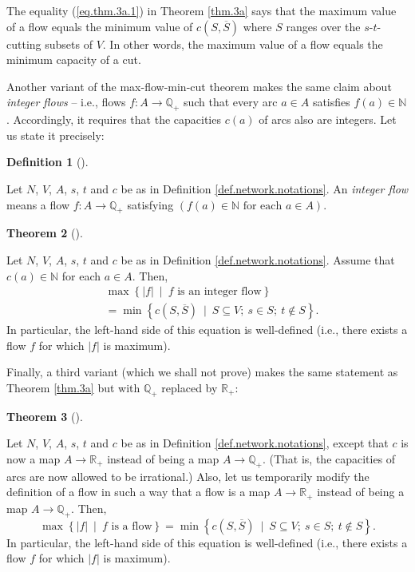 \documentclass[numbers=enddot,12pt,final,onecolumn,notitlepage]{scrartcl}%
\theoremstyle{definition}
\newtheorem{theo}{Theorem}[section]
\newenvironment{theorem}[1][]
{\begin{theo}[#1]\begin{leftbar}}
{\end{leftbar}\end{theo}}
\newtheorem{defi}[theo]{Definition}
\newenvironment{definition}[1][]
{\begin{defi}[#1]\begin{leftbar}}
{\end{leftbar}\end{defi}}
\begin{document}
The equality (\ref{eq.thm.3a.1}) in Theorem \ref{thm.3a} says that the maximum
value of a flow equals the minimum value of $c\left(  S,\overline{S}\right)  $
where $S$ ranges over the $s$-$t$-cutting subsets of $V$. In other words, the
maximum value of a flow equals the minimum capacity of a cut.

Another variant of the max-flow-min-cut theorem makes the same claim about
\textit{integer flows} -- i.e., flows $f:A\rightarrow\mathbb{Q}_{+}$ such that
every arc $a\in A$ satisfies $f\left(  a\right)  \in\mathbb{N}$. Accordingly,
it requires that the capacities $c\left(  a\right)  $ of arcs also are
integers. Let us state it precisely:

\begin{definition}
Let $N$, $V$, $A$, $s$, $t$ and $c$ be as in Definition
\ref{def.network.notations}. An \textit{integer flow} means a flow
$f:A\rightarrow\mathbb{Q}_{+}$ satisfying $\left(  f\left(  a\right)
\in\mathbb{N}\text{ for each }a\in A\right)  $.
\end{definition}

\begin{theorem}
\label{thm.3b}Let $N$, $V$, $A$, $s$, $t$ and $c$ be as in Definition
\ref{def.network.notations}. Assume that $c\left(  a\right)  \in\mathbb{N}$
for each $a\in A$. Then,%
\begin{align*}
&  \max\left\{  \left\vert f\right\vert \ \mid\ f\text{ is an integer
flow}\right\} \\
&  =\min\left\{  c\left(  S,\overline{S}\right)  \ \mid\ S\subseteq V;\ s\in
S;\ t\notin S\right\}  .
\end{align*}
In particular, the left-hand side of this equation is well-defined (i.e.,
there exists a flow $f$ for which $\left\vert f\right\vert $ is maximum).
\end{theorem}

Finally, a third variant (which we shall not prove) makes the same statement
as Theorem \ref{thm.3a} but with $\mathbb{Q}_{+}$ replaced by $\mathbb{R}_{+}$:

\begin{theorem}
\label{thm.3c}Let $N$, $V$, $A$, $s$, $t$ and $c$ be as in Definition
\ref{def.network.notations}, except that $c$ is now a map $A\rightarrow
\mathbb{R}_{+}$ instead of being a map $A\rightarrow\mathbb{Q}_{+}$. (That is,
the capacities of arcs are now allowed to be irrational.) Also, let us
temporarily modify the definition of a flow in such a way that a flow is a map
$A\rightarrow\mathbb{R}_{+}$ instead of being a map $A\rightarrow
\mathbb{Q}_{+}$. Then,%
\[
\max\left\{  \left\vert f\right\vert \ \mid\ f\text{ is a flow}\right\}
=\min\left\{  c\left(  S,\overline{S}\right)  \ \mid\ S\subseteq V;\ s\in
S;\ t\notin S\right\}  .
\]
In particular, the left-hand side of this equation is well-defined (i.e.,
there exists a flow $f$ for which $\left\vert f\right\vert $ is maximum).
\end{theorem}
\end{document}
